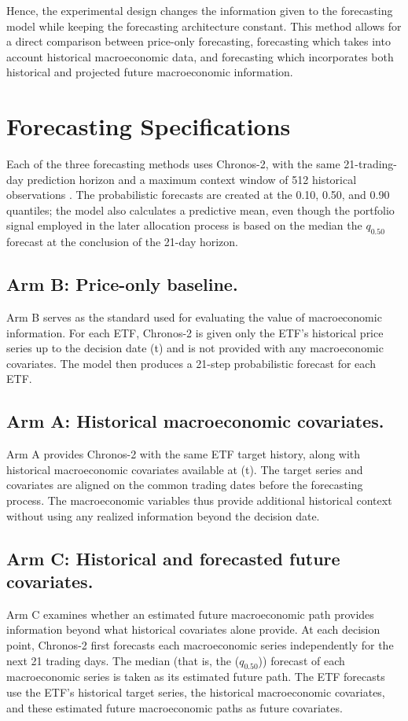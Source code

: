 \documentclass[12pt,a4paper,twoside,openany]{book}
\begin{document}
Hence, the experimental design changes the information given to the forecasting model while keeping the forecasting architecture constant. This method allows for a direct comparison between price-only forecasting, forecasting which takes into account historical macroeconomic data, and forecasting which incorporates both historical and projected future macroeconomic information.

\section{Forecasting Specifications}\label{forecasting-specifications}

Each of the three forecasting methods uses Chronos-2, with the same 21-trading-day prediction horizon and a maximum context window of 512 historical observations \cite{ansari2025chronos2}. The probabilistic forecasts are created at the 0.10, 0.50, and 0.90 quantiles; the model also calculates a predictive mean, even though the portfolio signal employed in the later allocation process is based on the median the \(q_{0.50}\) forecast at the conclusion of the 21-day horizon.

\subsection{Arm B: Price-only baseline.}
Arm B serves as the standard used for evaluating the value of macroeconomic information. For each ETF, Chronos-2 is given only the ETF's historical price series up to the decision date (t) and is not provided with any macroeconomic covariates. The model then produces a 21-step probabilistic forecast for each ETF.

\subsection{Arm A: Historical macroeconomic covariates.}
Arm A provides Chronos-2 with the same ETF target history, along with historical macroeconomic covariates available at (t). The target series and covariates are aligned on the common trading dates before the forecasting process. The macroeconomic variables thus provide additional historical context without using any realized information beyond the decision date. 

\subsection{Arm C: Historical and forecasted future covariates.}
Arm C examines whether an estimated future macroeconomic path provides information beyond what historical covariates alone provide. At each decision point, Chronos-2 first forecasts each macroeconomic series independently for the next 21 trading days. The median (that is, the (\(q_{0.50}\))) forecast of each macroeconomic series is taken as its estimated future path. The ETF forecasts use the ETF's historical target series, the historical macroeconomic covariates, and these estimated future macroeconomic paths as future covariates.
\end{document}
